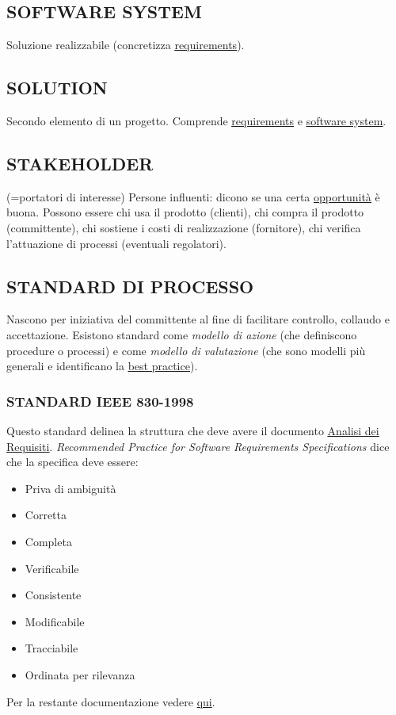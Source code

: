 		\subsection{SOFTWARE SYSTEM}  \label{sistemasoftware}
		Soluzione realizzabile (concretizza \underline{\hyperref[requirements]{requirements}}).

		\subsection{SOLUTION}  \label{solution}
		Secondo elemento di un progetto. Comprende \underline{\hyperref[requirements]{requirements}} e \underline{\hyperref[sistemasoftware]{software system}}.

		\subsection{STAKEHOLDER}  \label{stakeholder}
		(=portatori di interesse) Persone influenti: dicono se una certa \underline{\hyperref[opportunity]{opportunità}} è buona. Possono essere chi usa il prodotto (clienti), chi compra il prodotto (committente), chi sostiene i costi di realizzazione (fornitore), chi verifica l'attuazione di processi (eventuali regolatori).

		\subsection{STANDARD DI PROCESSO}  \label{standard}
		Nascono per iniziativa del committente al fine di facilitare controllo, collaudo e accettazione. Esistono standard come \textit{modello di azione} (che definiscono procedure o processi) e come \textit{modello di valutazione} (che sono modelli più generali e identificano la \underline{\hyperref[bes]{best practice}}).


			\subsubsection{STANDARD IEEE 830-1998}	 \label{ieee830}
			Questo standard delinea la struttura che deve avere il documento \underline{\hyperref[analisideirequisiti]{Analisi dei Requisiti}}.
			\textit{Recommended Practice for Software Requirements Specifications} dice che la specifica deve essere:
				\begin{itemize}
					\item Priva di ambiguità
					\item Corretta
					\item Completa
					\item Verificabile
					\item Consistente
					\item Modificabile
					\item Tracciabile
					\item Ordinata per rilevanza
				\end{itemize}
			Per la restante documentazione vedere \href{https://www.cs.purdue.edu/homes/apm/courses/BITSC461-fall03_SoftwareEngineering/miller-guidelines/IEEE830-1998.html}{qui}.


